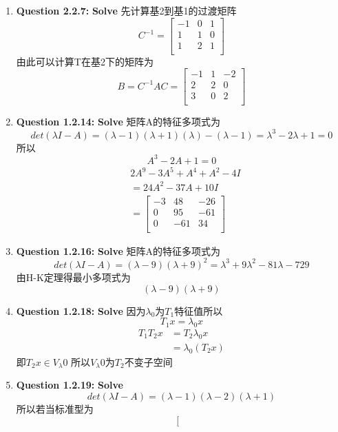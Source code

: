 \documentclass[UTF8]{uofa-eng-assignment}
\begin{document}
\begin{enumerate}
\item \textbf{Question 2.2.7:}
\textbf{Solve}
先计算基2到基1的过渡矩阵
$$C^{-1}=\left[
    \begin{matrix}
        -1&0&1\\
        1&1&0\\
        1&2&1\\
    \end{matrix}\right]
$$
由此可以计算T在基2下的矩阵为
$$
B=C^{-1}AC=\left[
    \begin{matrix}
        -1&1&-2\\
        2&2&0\\
        3&0&2\\
    \end{matrix}\right]
$$
\item \textbf{Question 1.2.14:}
\textbf{Solve}
矩阵A的特征多项式为
$$det(\lambda I-A)=(\lambda-1 )(\lambda+1)(\lambda)-(\lambda-1 )=\lambda^3-2\lambda+1=0
$$
所以
$$A^3-2A+1=0$$
$$
\begin{aligned}
    &2A^9-3A^5+A^4+A^2-4I\\
    &=24A^2-37A+10I\\
    &=\left[
        \begin{matrix}
            -3&48&-26\\
            0&95&-61\\
            0&-61&34\\
        \end{matrix}\right]
\end{aligned}    
$$
\item \textbf{Question 1.2.16:}
\textbf{Solve}
矩阵A的特征多项式为
$$det(\lambda I-A)=(\lambda-9)(\lambda+9)^2=\lambda^3+9\lambda^2-81\lambda-729$$
由H-K定理得最小多项式为
$$(\lambda-9)(\lambda+9)$$
\item \textbf{Question 1.2.18:}
\textbf{Solve}
因为$\lambda_0$为$T_1$特征值所以
$$T_1x=\lambda_0 x $$
$$
\begin{aligned}
    T_1T_2x&=T_2 \lambda_0 x\\
    &=\lambda_0(T_2x)
\end{aligned}
$$
即$T_2x \in V_\lambda0$
所以$V_\lambda0$为$T_2$不变子空间
\item \textbf{Question 1.2.19:}
\textbf{Solve}
$$det(\lambda I-A)=(\lambda-1)(\lambda-2)(\lambda+1)$$
所以若当标准型为
$$
\left[
        \begin{matrix}

\end{matrix}$$
\end{enumerate}
\end{document}
